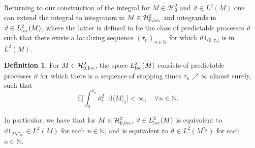 \documentclass[11pt,a4paper,twoside,openany]{report}
\numberwithin{equation}{section}
\newcommand{\diff}{\mathop{}\!\mathrm{d}}
\theoremstyle{plain} %
\theoremstyle{definition} %
\newtheorem{definition}[theorem]{Definition}
\theoremstyle{remark} %
\begin{document}
Returning to our construction of the integral for \(M\in\mathcal{H}^2_0\) and \(\vartheta\in L^2(M)\) one can  extend the integral to integrators in \(M\in\mathcal{H}^2_{0,\rm{loc}}\) and integrands in \(\vartheta\in L^2_{\rm{loc}}(M)\), where the latter is defined to be the class of predictable processes \(\vartheta\) such that there exists a localizing sequence \((\tau_n)_{n\in\mathbb{N}}\) for which \(\vartheta1_{(0,\tau_n]}\) is in \(L^2(M)\). 

\begin{definition}\label{def:L^p(M)_loc}
 For \(M\in\mathcal{H}^2_{0,\rm{loc}}\), the space \(L_{\rm{loc}}^2(M)\) consists of predictable processes \(\vartheta\) for which there is  a sequence of stopping times \(\tau_n\nearrow\infty\) almost surely, such that 
    \begin{equation*}
        \mathbb{E}\bigg[\int_0^{\tau_n}\vartheta_t^2\diff \langle M\rangle_t\bigg]<\infty,\quad\forall n\in\mathbb{N}.
    \end{equation*}
\end{definition}
In particular, we have that for \(M\in\mathcal{H}_{0,\rm{loc}}^2\), \(\vartheta\in L^2_{\rm{loc}}(M)\) is equivalent to \(\vartheta1_{(0,\tau_n]}\in L^2(M)\) for each \(n\in\mathbb{N}\), and is equivalent to \(\vartheta\in L^2(M^{\tau_n})\) for each \(n\in\mathbb{N}\).
\end{document}
